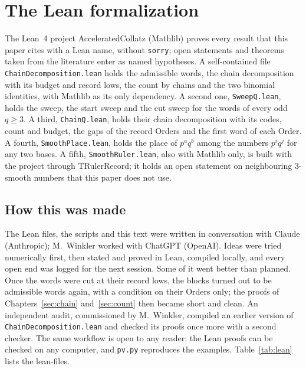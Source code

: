 \documentclass[11pt,a4paper,titlepage]{article}
\newcommand{\lean}[1]{\textsf{#1}}
\begin{document}
\appendix

\section{The Lean formalization}
\label{app:lean}

The Lean~4 project \lean{AcceleratedCollatz} (Mathlib) proves every result
that this paper cites with a Lean name, without \texttt{sorry}; open statements and
theorems taken from the literature enter as named hypotheses. A self-contained file
\texttt{ChainDecomposition.lean} holds the admissible words, the chain
decomposition with its budget and record lows, the count by chains and the two
binomial identities, with Mathlib as its only dependency. A second one,
\texttt{SweepQ.lean}, holds the sweep, the start sweep and the cut sweep for the
words of every odd $q \ge 3$. A third, \texttt{ChainQ.lean}, holds their chain
decomposition with its codes, count and budget, the gaps of the record Orders and the
first word of each Order. A fourth, \texttt{SmoothPlace.lean}, holds the place of
$p^a q^b$ among the numbers $p^i q^j$ for any two bases. A fifth,
\texttt{SmoothRuler.lean}, also with Mathlib only, is built with the project through
\lean{TRulerRecord}; it holds an open statement on neighbouring $3$-smooth numbers that
this paper does not use.

\subsection*{How this was made}

The Lean files, the scripts and this text were written in conversation with
Claude (Anthropic); M.~Winkler worked with ChatGPT (OpenAI). Ideas were tried numerically first, then stated and proved in
Lean, compiled locally, and every open end was logged for the next session. Some
of it went better than planned. Once the words were cut at their record lows, the
blocks turned out to be admissible words again, with a condition on their Orders
only; the proofs of Chapters~\ref{sec:chain} and~\ref{sec:count} then became short
and clean. An independent audit, commissioned by M.~Winkler, compiled an earlier
version of \texttt{ChainDecomposition.lean} and checked its proofs once more with a second
checker. The same workflow is open to any reader:
the Lean proofs can be checked on any computer, and \texttt{pv.py} reproduces the
examples. Table~\ref{tab:lean} lists the lean-files.
\end{document}
